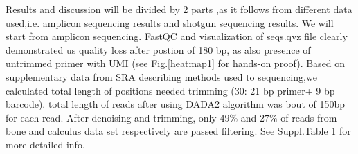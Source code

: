 \documentclass{article}
\begin{document}
Results and discussion will be divided by 2 parts ,as it follows from different data used,i.e. amplicon sequencing results and shotgun sequencing results. We will start from amplicon sequencing.
FastQC and visualization of seqs.qvz file clearly demonstrated us quality loss after postion of 180 bp, as also presence of untrimmed primer with UMI (see Fig.\ref{heatmap1} for hands-on proof). Based on supplementary data from SRA describing methods used to sequencing,we calculated total length of positions needed trimming (30: 21 bp primer+ 9 bp barcode). total length of reads after using DADA2 algorithm was bout of 150bp for each read. After denoising and trimming, only $49\%$ and $27\%$ of reads from bone and calculus data set respectively are passed filtering. See Suppl.Table 1 for more detailed info.

\begin{figure} 
	\centering

\end{figure}
\end{document}
